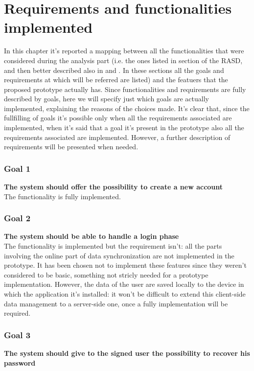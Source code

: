 \chapter{Requirements and functionalities implemented}

In this chapter it's reported a mapping between all the functionalities that were considered during the analysis part (i.e. the ones listed in section  of the RASD, and then better described also in  and . In these sections all the goals and requirements at which will be referred are listed) and the featuers that the proposed prototype actually has. Since functionalities and requirements are fully described by goals, here we will specify just which goals are actually implemented, explaining the reasons of the choices made.
It's clear that, since the fullfilling of goals it's possible only when all the requirements associated are implemented, when it's said that a goal it's present in the prototype also all the requirements associated are implemented.
However, a further description of requirements will be presented when needed.

\subsection{Goal 1} \label{subsect:gNewAccount}
\textbf{The system should offer the possibility to create a new account}\\

The functionality is fully implemented.

\subsection{Goal 2} \label{subsect:gLoginPhase}
\textbf{The system should be able to handle a login phase}\\

The functionality is implemented but the requirement  isn't: all the parts involving the online part of data synchronization are not implemented in the prototype. It has been chosen not to implement these features since they weren't considered to be basic, something not stricly needed for a prototype implementation. However, the data of the user are saved locally to the device in which the application it's installed: it won't be difficult to extend this client-side data management to a server-side one, once a fully implementation will be required.

\subsection{Goal 3} \label{subsect:gPasswordRecovery}
\textbf{The system should give to the signed user the possibility to recover his password} \\

